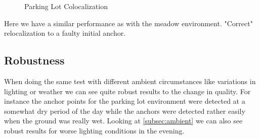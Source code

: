 \begin{figure}[htp]
    \centering
        \hfill
        \hfill
    \caption{Parking Lot Colocalization}
    \label{fig:parking_lot_basic}
\end{figure}

Here we have a similar performance as with the meadow environment. "Correct" relocalization to a faulty initial anchor. 

\subsection{Robustness}\label{subsec:robustness}

When doing the same test with different ambient circumstances like variations in lighting or weather we can see quite robust results to the change in quality. For instance the anchor points for the parking lot environment were detected at a somewhat dry period of the day while the anchors were detected rather easily when the ground was really wet. Looking at \cref{subsec:ambient} we can also see robust results for worse lighting conditions in the evening.

